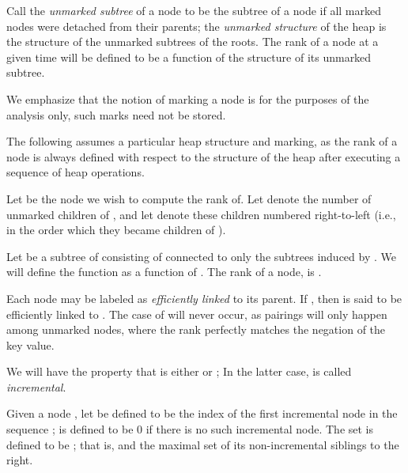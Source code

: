 Call the \emph{unmarked subtree} of a node to be the subtree of a node if all marked nodes were detached from their parents; the \emph{unmarked structure} of the heap is the structure of the unmarked subtrees of the roots. The rank of a node at a given time will be defined to be a function of the structure of its unmarked subtree.
\begin{fullonly}
 We emphasize that the notion of marking a node is for the purposes of the analysis only, such marks need not be stored.
\end{fullonly}

The following assumes a particular heap structure and marking, as the rank of a node is always defined with respect to the structure of the heap after executing a sequence of heap operations. 
\begin{fullonly}

\end{fullonly}
Let  be the node we wish to compute the rank of. Let  denote the number of unmarked children of , and let  denote these children numbered right-to-left (i.e., in the order which they became children of ).
\begin{fullonly}

\end{fullonly}
Let  be a subtree of  consisting of  connected to only the subtrees induced by . We will define the function  as a function of . The rank of a  node,  is . 
\begin{fullonly}

\end{fullonly}
Each node  may be labeled as \emph{efficiently linked} to its parent.
If , then  is said to be efficiently linked to . The case of  will never occur, as pairings will only happen among unmarked nodes, where the rank perfectly matches the negation of the key value.
\begin{fullonly}

\end{fullonly}
We will have the property that  is either  or ; In the latter case,  is called \emph{incremental}. 
\begin{fullonly}

\end{fullonly}
Given a node , let  be defined to be the index of the first incremental node in the sequence ;  is defined to be 0 if there is no such incremental node.
The set  is defined to be ; that is,  and the maximal set of its non-incremental siblings to the right.
\begin{fullonly}

\end{fullonly}
